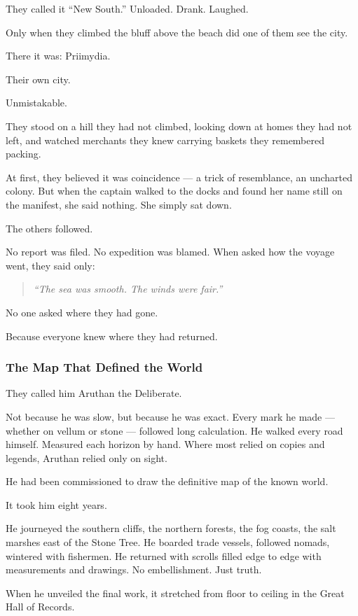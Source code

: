 \documentclass[12pt]{article}
\begin{document}
They called it ``New South.'' Unloaded. Drank. Laughed.

Only when they climbed the bluff above the beach did one of them see the city.

There it was: Priimydia.

Their own city.

Unmistakable.

They stood on a hill they had not climbed, looking down at homes they had not left, and watched merchants they knew carrying baskets they remembered packing.

At first, they believed it was coincidence — a trick of resemblance, an uncharted colony. But when the captain walked to the docks and found her name still on the manifest, she said nothing. She simply sat down.

The others followed.

No report was filed. No expedition was blamed. When asked how the voyage went, they said only:

\begin{quote}
\emph{``The sea was smooth. The winds were fair.''}
\end{quote}

No one asked where they had gone.

Because everyone knew where they had returned.

\dotfill

\subsubsection{The Map That Defined the World}

They called him Aruthan the Deliberate.

Not because he was slow, but because he was exact. Every mark he made — whether on vellum or stone — followed long calculation. He walked every road himself. Measured each horizon by hand. Where most relied on copies and legends, Aruthan relied only on sight.

He had been commissioned to draw the definitive map of the known world.

It took him eight years.

He journeyed the southern cliffs, the northern forests, the fog coasts, the salt marshes east of the Stone Tree. He boarded trade vessels, followed nomads, wintered with fishermen. He returned with scrolls filled edge to edge with measurements and drawings. No embellishment. Just truth.

When he unveiled the final work, it stretched from floor to ceiling in the Great Hall of Records.
\end{document}
